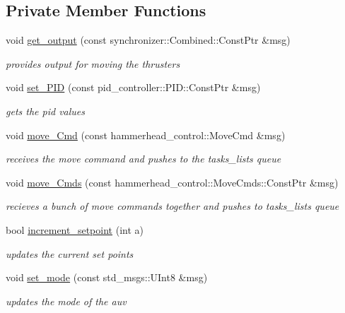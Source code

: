 \subsection*{Private Member Functions}
\begin{DoxyCompactItemize}
\item 
void \hyperlink{classControl_a2256e97ad7be3e6f6904824bc35431a1}{get\+\_\+output} (const synchronizer\+::\+Combined\+::\+Const\+Ptr \&msg)
\begin{DoxyCompactList}\small\item\em provides output for moving the thrusters \end{DoxyCompactList}\item 
void \hyperlink{classControl_a45bba7b17f6c425ad51339e9797d6440}{set\+\_\+\+P\+ID} (const pid\+\_\+controller\+::\+P\+I\+D\+::\+Const\+Ptr \&msg)
\begin{DoxyCompactList}\small\item\em gets the pid values \end{DoxyCompactList}\item 
void \hyperlink{classControl_a9b60da70983c874ff9cf2663950dee08}{move\+\_\+\+Cmd} (const hammerhead\+\_\+control\+::\+Move\+Cmd \&msg)
\begin{DoxyCompactList}\small\item\em receives the move command and pushes to the tasks\+\_\+lists queue \end{DoxyCompactList}\item 
void \hyperlink{classControl_a7e8067da35d2bdef012d1e2b5533ac35}{move\+\_\+\+Cmds} (const hammerhead\+\_\+control\+::\+Move\+Cmds\+::\+Const\+Ptr \&msg)
\begin{DoxyCompactList}\small\item\em recieves a bunch of move commands together and pushes to tasks\+\_\+lists queue \end{DoxyCompactList}\item 
bool \hyperlink{classControl_a6ee8f4ba7ab102861a2d2c3eeeb96201}{increment\+\_\+setpoint} (int a)
\begin{DoxyCompactList}\small\item\em updates the current set points \end{DoxyCompactList}\item 
void \hyperlink{classControl_ae6fc47fc2c8a47346e558e4b831cc40f}{set\+\_\+mode} (const std\+\_\+msgs\+::\+U\+Int8 \&msg)
\begin{DoxyCompactList}\small\item\em updates the mode of the auv \end{DoxyCompactList}\item 

\end{DoxyCompactItemize}
